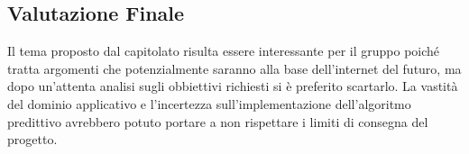 \subsection{Valutazione Finale}
Il tema proposto dal capitolato risulta essere interessante per il gruppo poiché tratta argomenti che potenzialmente saranno alla base dell'internet del futuro, ma dopo un'attenta analisi sugli obbiettivi richiesti si è preferito scartarlo. La vastità del dominio applicativo e l'incertezza sull'implementazione dell'algoritmo predittivo avrebbero potuto portare a non rispettare i limiti di consegna del progetto.
